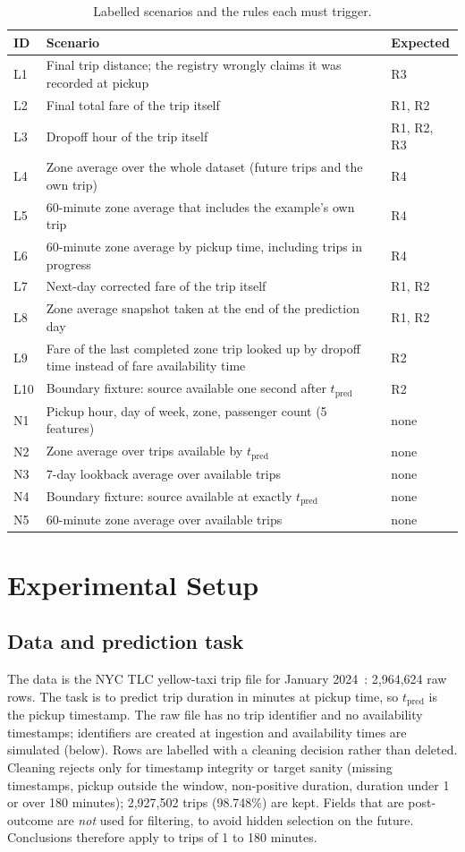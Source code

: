 \documentclass[11pt,a4paper]{article}
\newcommand{\tpred}{$t_{\mathrm{pred}}$}
\begin{document}
\begin{table}[H]
\centering\small
\caption{Labelled scenarios and the rules each must trigger.}
\label{tab:scen}
\begin{tabular}{@{}l p{8.6cm} l@{}}
\toprule
ID & Scenario & Expected \\
\midrule
L1 & Final trip distance; the registry wrongly claims it was recorded at pickup & R3 \\
L2 & Final total fare of the trip itself & R1, R2 \\
L3 & Dropoff hour of the trip itself & R1, R2, R3 \\
L4 & Zone average over the whole dataset (future trips and the own trip) & R4 \\
L5 & 60-minute zone average that includes the example's own trip & R4 \\
L6 & 60-minute zone average by pickup time, including trips in progress & R4 \\
L7 & Next-day corrected fare of the trip itself & R1, R2 \\
L8 & Zone average snapshot taken at the end of the prediction day & R1, R2 \\
L9 & Fare of the last completed zone trip looked up by dropoff time instead of fare availability time & R2 \\
L10 & Boundary fixture: source available one second after \tpred{} & R2 \\
\midrule
N1 & Pickup hour, day of week, zone, passenger count (5 features) & none \\
N2 & Zone average over trips available by \tpred{} & none \\
N3 & 7-day lookback average over available trips & none \\
N4 & Boundary fixture: source available at exactly \tpred{} & none \\
N5 & 60-minute zone average over available trips & none \\
\bottomrule
\end{tabular}
\end{table}

\section{Experimental Setup}
\subsection{Data and prediction task}
The data is the NYC TLC yellow-taxi trip file for January 2024~\cite{nyctlc}: 2{,}964{,}624 raw rows. The task is to predict trip duration in minutes at pickup time, so \tpred{} is the pickup timestamp. The raw file has no trip identifier and no availability timestamps; identifiers are created at ingestion and availability times are simulated (below). Rows are labelled with a cleaning decision rather than deleted. Cleaning rejects only for timestamp integrity or target sanity (missing timestamps, pickup outside the window, non-positive duration, duration under 1 or over 180 minutes); 2{,}927{,}502 trips (98.748\%) are kept. Fields that are post-outcome are \emph{not} used for filtering, to avoid hidden selection on the future. Conclusions therefore apply to trips of 1 to 180 minutes.
\end{document}
